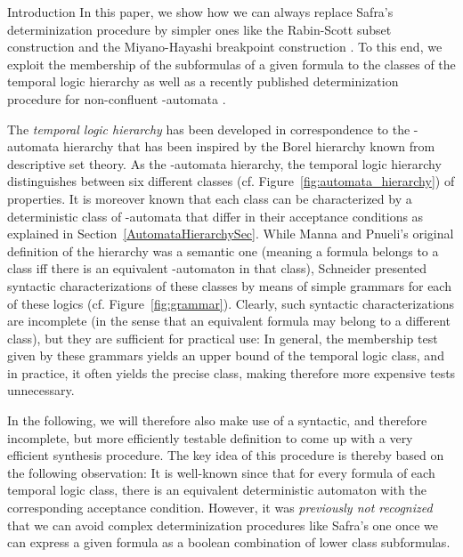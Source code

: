 \documentclass[copyright,creativecommons]{eptcs}
\begin{document}
\begin{section}{Introduction}
In this paper, we show how we can always replace Safra's determinization procedure by simpler ones like the Rabin-Scott subset construction and the Miyano-Hayashi breakpoint construction \cite{MiHa84,Schn03}. To this end, we exploit the membership of the subformulas of a given formula to the classes of the temporal logic hierarchy as well as a recently published determinization procedure for non-confluent -automata \cite{MoSc08}.

The \emph{temporal logic hierarchy} \cite{ChMP92,Schn03} has been developed in correspondence to the -automata hierarchy \cite{Land69} that has been inspired by the Borel hierarchy known from descriptive set theory. As the -automata hierarchy, the temporal logic hierarchy distinguishes between six different classes (cf. Figure~\ref{fig:automata_hierarchy}) of properties. It is moreover known that each class can be characterized by a deterministic class of -automata that differ in their acceptance conditions as explained in Section~\ref{AutomataHierarchySec}. While Manna and Pnueli's original definition of the hierarchy was a semantic one (meaning a  formula belongs to a class iff there is an equivalent -automaton in that class), Schneider \cite{Schn01b,Schn03} presented syntactic characterizations of these classes by means of simple grammars for each of these logics (cf. Figure~\ref{fig:grammar}). Clearly, such syntactic characterizations are incomplete (in the sense that an equivalent formula may belong to a different class), but they are sufficient for practical use: In general, the membership test given by these grammars yields an upper bound of the temporal logic class, and in practice, it often yields the precise class, making therefore more expensive tests unnecessary.

In the following, we will therefore also make use of a syntactic, and therefore incomplete, but more efficiently testable definition to come up with a very efficient  synthesis procedure. The key idea of this procedure is thereby based on the following observation: It is well-known since \cite{ChMP92} that for every  formula of each temporal logic class, there is an equivalent deterministic automaton with the corresponding acceptance condition. However, it was \emph{previously not recognized} that we can avoid complex determinization procedures like Safra's one once we can express a given  formula as a boolean combination of lower class subformulas.


\end{section}
\end{document}
